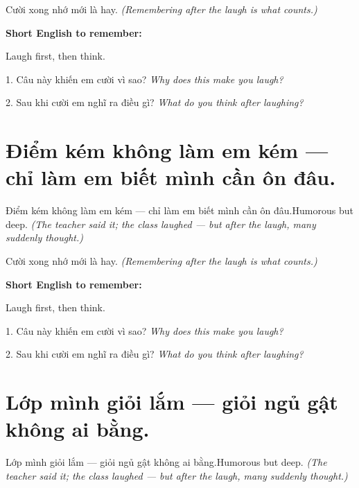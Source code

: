 \begin{baihoc}
Cười xong nhớ mới là hay.
\textit{(Remembering after the laugh is what counts.)}
\end{baihoc}

\begin{ghinhoanh}
\textbf{Short English to remember:}

Laugh first, then think.

\end{ghinhoanh}

\begin{tuhocnhanh}
1. Câu này khiến em cười vì sao? \textit{Why does this make you laugh?}

2. Sau khi cười em nghĩ ra điều gì? \textit{What do you think after laughing?}
\end{tuhocnhanh}
\ngancach


\section{Điểm kém không làm em kém — chỉ làm em biết mình cần ôn đâu.}
\begin{truyen}{Điểm kém không làm em kém — chỉ làm em biết mình cần ôn đâu.}{Humorous but deep.}
\textit{(The teacher said it; the class laughed — but after the laugh, many suddenly thought.)}
\end{truyen}

\begin{baihoc}
Cười xong nhớ mới là hay.
\textit{(Remembering after the laugh is what counts.)}
\end{baihoc}

\begin{ghinhoanh}
\textbf{Short English to remember:}

Laugh first, then think.

\end{ghinhoanh}

\begin{tuhocnhanh}
1. Câu này khiến em cười vì sao? \textit{Why does this make you laugh?}

2. Sau khi cười em nghĩ ra điều gì? \textit{What do you think after laughing?}
\end{tuhocnhanh}
\ngancach


\section{Lớp mình giỏi lắm — giỏi ngủ gật không ai bằng.}
\begin{truyen}{Lớp mình giỏi lắm — giỏi ngủ gật không ai bằng.}{Humorous but deep.}
\textit{(The teacher said it; the class laughed — but after the laugh, many suddenly thought.)}
\end{truyen}

